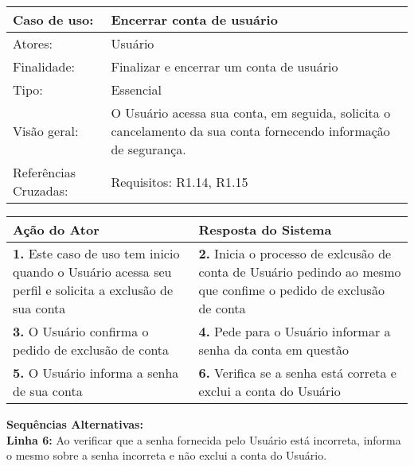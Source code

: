 \documentclass[12pt,a4paper,onecolumn,titlepage]{article}
\begin{document}
\begin{table}[h!]
\begin{center}
\begin{tabular}{p{2.5cm} p{9.5cm}}
Caso de uso: & \textbf{Encerrar conta de usuário} \\ \hline
Atores: & Usuário \\ \hline
Finalidade: & Finalizar e encerrar um conta de usuário\\ \hline
Tipo: & Essencial \\ \hline
Visão geral: & O Usuário acessa sua conta, em seguida, solicita o cancelamento da sua conta fornecendo informação de segurança. \\ \hline
Referências Cruzadas: & Requisitos: R1.14, R1.15\\

\end{tabular}
\end{center}
\end{table} 

\begin{center}
\def\arraystretch{1.1}
\begin{tabular}{|p{6cm}|p{6cm}|}

\hline
\textbf{Ação do Ator} & \textbf{Resposta do Sistema} \\ \hline
\textbf{1.} Este caso de uso tem inicio quando o Usuário acessa seu perfil e solicita a exclusão de sua conta  & \textbf{2.} Inicia o processo de exlcusão de conta de Usuário pedindo ao mesmo que confime o pedido de exclusão de conta \\ \hline
\textbf{3.} O Usuário confirma o pedido de exclusão de conta  & \textbf{4.} Pede para o Usuário informar a senha da conta em questão  \\ \hline
\textbf{5.} O Usuário informa a senha de sua conta  & \textbf{6.} Verifica se a senha está correta e exclui a conta do Usuário\\ \hline
\end{tabular}
\end{center}

\textbf{Sequências Alternativas:} \\
\textbf{Linha 6:} Ao verificar que a senha fornecida pelo Usuário está incorreta, informa o mesmo sobre a senha incorreta e não exclui a conta do Usuário.

\newpage
\end{document}
